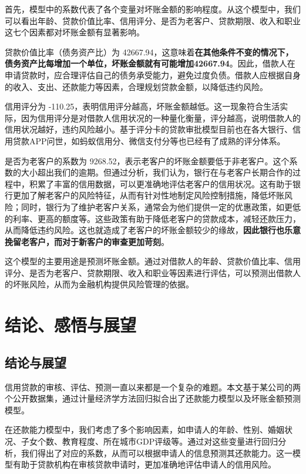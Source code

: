 \documentclass[13.5pt,hyperref,a4paper,UTF8]{ctexart}
\begin{document}
首先，模型中的系数代表了各个变量对坏账金额的影响程度。从这个模型中，我们可以看出年龄、贷款价值比率、信用评分、是否为老客户、贷款期限、收入和职业这七个因素都对坏账金额有显著影响。


贷款价值比率（债务资产比）为 42667.94，这意味着\textbf{在其他条件不变的情况下，债务资产比每增加一个单位，坏账金额就有可能增加42667.94}。因此，借款人在申请贷款时，应合理评估自己的债务承受能力，避免过度负债。借款人应根据自身的收入、支出、还款能力等因素，合理规划贷款金额，以降低违约风险。

信用评分为 -110.25，表明信用评分越高，坏账金额越低。这一现象符合生活实际，因为信用评分是对借款人信用状况的一种量化衡量，评分越高，说明借款人的信用状况越好，违约风险越小。基于评分卡的贷款审批模型目前也在各大银行、信用贷款APP问世，如蚂蚁信用分、微信支付分等也已经有了成熟的评分体系。

是否为老客户的系数为 9268.52，表示老客户的坏账金额要低于非老客户。这个系数的大小超出我们的逾期。但通过分析，我们认为，银行在与老客户长期合作的过程中，积累了丰富的信用数据，可以更准确地评估老客户的信用状况。这有助于银行更加了解老客户的风险特征，从而有针对性地制定风险控制措施，降低坏账风险；同时，银行为了维护老客户关系，通常会为他们提供一定的优惠政策，如更低的利率、更高的额度等。这些政策有助于降低老客户的贷款成本，减轻还款压力，从而降低违约风险。这也就造成了老客户的坏账金额较少的缘故，\textbf{因此银行也乐意挽留老客户，而对于新客户的审查更加苛刻}。

这个模型的主要用途是预测坏账金额。通过对借款人的年龄、贷款价值比率、信用评分、是否为老客户、贷款期限、收入和职业等因素进行评估，可以预测出借款人的坏账风险，从而为金融机构提供风险管理的依据。



\newpage
\section{结论、感悟与展望}
\subsection{结论与展望}

信用贷款的审核、评估、预测一直以来都是一个复杂的难题。本文基于某公司的两个公开数据集，通过计量经济学方法回归拟合出了还款能力模型以及坏账金额预测模型。

在还款能力模型中，我们考虑了多个影响因素，如申请人的年龄、性别、婚姻状况、子女个数、教育程度、所在城市GDP评级等。通过对这些变量进行回归分析，我们得出了对应的系数，从而可以根据申请人的信息预测其还款能力。这一模型有助于贷款机构在审核贷款申请时，更加准确地评估申请人的信用风险。
\end{document}
